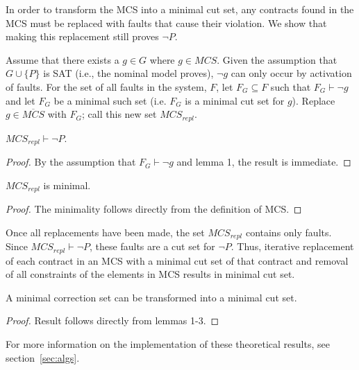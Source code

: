 In order to transform the MCS into a minimal cut set, any contracts found in the MCS must be replaced with faults that cause their violation. We show that making this replacement still proves $\neg P$.

Assume that there exists a $g \in G$ where $g \in MCS$. Given the assumption that $G \cup \{P\}$ is SAT (i.e., the nominal model proves), $\neg g$ can only occur by activation of faults. For the set of all faults in the system, $F$, let $F_G \subseteq F$ such that $F_G \vdash \neg g$ and let $F_G$ be a minimal such set (i.e. $F_G$ is a minimal cut set for $g$). Replace $g \in \overline{MCS}$ with $F_G$; call this new set $MCS_{repl}$.

\begin{lemma}
$MCS_{repl} \vdash \neg P$.
\begin{proof}
By the assumption that $F_G \vdash \neg g$ and lemma 1, the result is immediate.
\end{proof}
\label{lem:corrSet}
\end{lemma}

\begin{lemma}
$MCS_{repl}$ is minimal.
\begin{proof}
The minimality follows directly from the definition of MCS. 

\end{proof}
\label{lem:minCorrSet}
\end{lemma}

Once all replacements have been made, the set $MCS_{repl}$ contains only faults. Since $MCS_{repl} \vdash \neg P$, these faults are a cut set for $\neg P$. Thus, iterative replacement of each contract in an MCS with a minimal cut set of that contract and removal of all constraints of the elements in MCS results in minimal cut set. 

\begin{theorem}
A minimal correction set can be transformed into a minimal cut set.
\begin{proof}
Result follows directly from lemmas 1-3.
\end{proof}
\end{theorem}

For more information on the implementation of these theoretical results, see section~\ref{sec:algs}.





